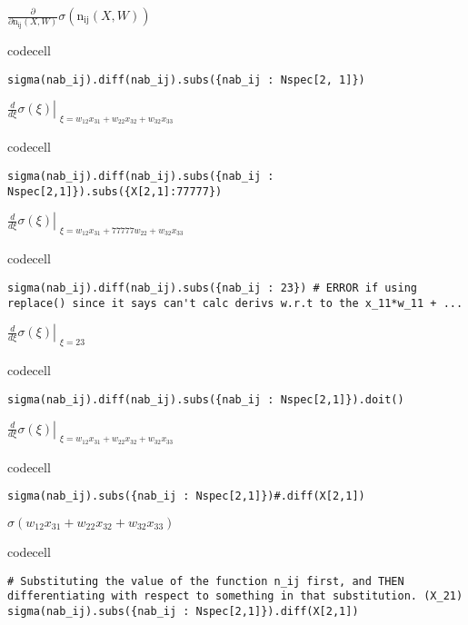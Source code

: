 $\displaystyle \frac{\partial}{\partial \operatorname{n_{ij}}{\left(X,W \right)}} \sigma{\left(\operatorname{n_{ij}}{\left(X,W \right)} \right)}$

codecell

\begin{verbatim}
sigma(nab_ij).diff(nab_ij).subs({nab_ij : Nspec[2, 1]})
\end{verbatim}

$\displaystyle \left. \frac{d}{d \xi} \sigma{\left(\xi \right)} \right|_{\substack{ \xi=w_{12} x_{31} + w_{22} x_{32} + w_{32} x_{33} }}$

codecell

\begin{verbatim}
sigma(nab_ij).diff(nab_ij).subs({nab_ij : Nspec[2,1]}).subs({X[2,1]:77777})
\end{verbatim}

$\displaystyle \left. \frac{d}{d \xi} \sigma{\left(\xi \right)} \right|_{\substack{ \xi=w_{12} x_{31} + 77777 w_{22} + w_{32} x_{33} }}$

codecell

\begin{verbatim}
sigma(nab_ij).diff(nab_ij).subs({nab_ij : 23}) # ERROR if using replace() since it says can't calc derivs w.r.t to the x_11*w_11 + ...
\end{verbatim}

$\displaystyle \left. \frac{d}{d \xi} \sigma{\left(\xi \right)} \right|_{\substack{ \xi=23 }}$

codecell

\begin{verbatim}
sigma(nab_ij).diff(nab_ij).subs({nab_ij : Nspec[2,1]}).doit()
\end{verbatim}

$\displaystyle \left. \frac{d}{d \xi} \sigma{\left(\xi \right)} \right|_{\substack{ \xi=w_{12} x_{31} + w_{22} x_{32} + w_{32} x_{33} }}$

codecell

\begin{verbatim}
sigma(nab_ij).subs({nab_ij : Nspec[2,1]})#.diff(X[2,1])
\end{verbatim}

$\displaystyle \sigma{\left(w_{12} x_{31} + w_{22} x_{32} + w_{32} x_{33} \right)}$

codecell

\begin{verbatim}
# Substituting the value of the function n_ij first, and THEN differentiating with respect to something in that substitution. (X_21)
sigma(nab_ij).subs({nab_ij : Nspec[2,1]}).diff(X[2,1])
\end{verbatim}

